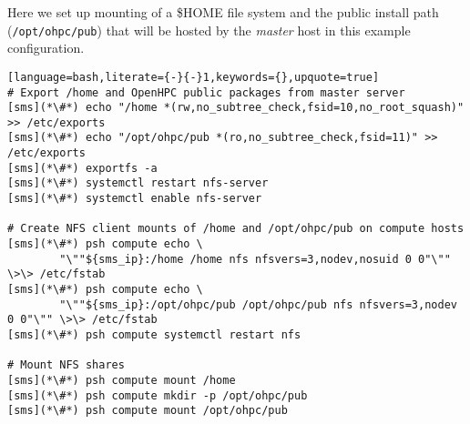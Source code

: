 Here we set up \NFS{}  mounting of a
\$HOME file system and the public \OHPC{} install path (\texttt{/opt/ohpc/pub})
that will be hosted by the {\em master} host in this  example configuration.

\vspace*{0.15cm}
\begin{lstlisting}[language=bash,literate={-}{-}1,keywords={},upquote=true]
# Export /home and OpenHPC public packages from master server
[sms](*\#*) echo "/home *(rw,no_subtree_check,fsid=10,no_root_squash)" >> /etc/exports
[sms](*\#*) echo "/opt/ohpc/pub *(ro,no_subtree_check,fsid=11)" >> /etc/exports
[sms](*\#*) exportfs -a
[sms](*\#*) systemctl restart nfs-server
[sms](*\#*) systemctl enable nfs-server

# Create NFS client mounts of /home and /opt/ohpc/pub on compute hosts
[sms](*\#*) psh compute echo \
        "\""${sms_ip}:/home /home nfs nfsvers=3,nodev,nosuid 0 0"\"" \>\> /etc/fstab
[sms](*\#*) psh compute echo \
        "\""${sms_ip}:/opt/ohpc/pub /opt/ohpc/pub nfs nfsvers=3,nodev 0 0"\"" \>\> /etc/fstab
[sms](*\#*) psh compute systemctl restart nfs

# Mount NFS shares
[sms](*\#*) psh compute mount /home
[sms](*\#*) psh compute mkdir -p /opt/ohpc/pub
[sms](*\#*) psh compute mount /opt/ohpc/pub

\end{lstlisting}

